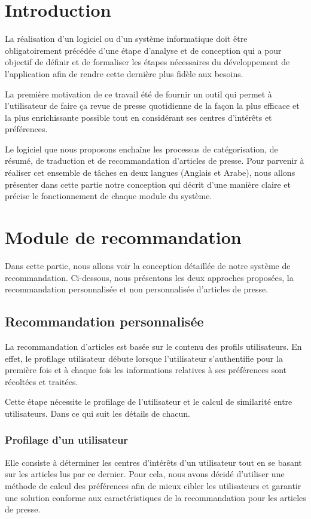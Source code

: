 
\newpage
\section{Introduction}
La réalisation d'un logiciel ou d'un système informatique doit être obligatoirement précédée d'une étape d'analyse et de conception qui a pour objectif de définir et de formaliser les étapes nécessaires du développement de l'application afin de rendre cette dernière plus fidèle aux besoins.

La première motivation de ce travail été de fournir un outil qui permet à l'utilisateur de faire ça revue de presse quotidienne de la façon la plus efficace et la plus enrichissante possible tout en considérant ses centres d'intérêts et préférences. 

Le logiciel que nous proposons enchaîne les processus de catégorisation, de résumé, de traduction et de recommandation d'articles de presse. Pour parvenir à réaliser cet ensemble de tâches en deux langues (Anglais et Arabe), nous allons présenter dans cette partie notre conception qui décrit d'une manière claire et précise le fonctionnement de chaque module du système. 


\section{Module de recommandation}
Dans cette partie, nous allons voir la conception détaillée de notre système de recommandation. Ci-dessous, nous présentons les deux approches proposées, la recommandation personnalisée et non personnalisée d'articles de presse.
    \subsection{Recommandation personnalisée\label{personal}}
    La recommandation d'articles est basée sur le contenu des profils utilisateurs. En effet, le profilage utilisateur débute lorsque l'utilisateur s'authentifie pour la première fois et à chaque fois les informations relatives à ses préférences sont récoltées et traitées.

    Cette étape nécessite le profilage de l'utilisateur et le calcul de similarité entre utilisateurs. Dans ce qui suit les détails de chacun.

        \subsubsection{Profilage d'un utilisateur}
        Elle consiste à déterminer les centres d'intérêts d'un utilisateur tout en se basant sur les articles lus par ce dernier. Pour cela, nous avons décidé d'utiliser une méthode de calcul des préférences afin de mieux cibler les utilisateurs et garantir une solution conforme aux caractéristiques de la recommandation pour les articles de presse. 


